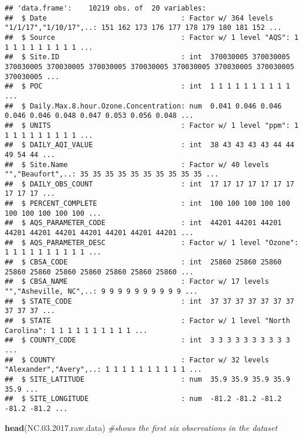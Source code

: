 \documentclass[]{article}
\newenvironment{Shaded}{\begin{snugshade}}{\end{snugshade}}
\newcommand{\KeywordTok}[1]{\textcolor[rgb]{0.13,0.29,0.53}{\textbf{#1}}}
\newcommand{\FloatTok}[1]{\textcolor[rgb]{0.00,0.00,0.81}{#1}}
\newcommand{\CommentTok}[1]{\textcolor[rgb]{0.56,0.35,0.01}{\textit{#1}}}
\newcommand{\NormalTok}[1]{#1}
\begin{document}
\begin{verbatim}
## 'data.frame':    10219 obs. of  20 variables:
##  $ Date                                : Factor w/ 364 levels "1/1/17","1/10/17",..: 151 162 173 176 177 178 179 180 181 152 ...
##  $ Source                              : Factor w/ 1 level "AQS": 1 1 1 1 1 1 1 1 1 1 ...
##  $ Site.ID                             : int  370030005 370030005 370030005 370030005 370030005 370030005 370030005 370030005 370030005 370030005 ...
##  $ POC                                 : int  1 1 1 1 1 1 1 1 1 1 ...
##  $ Daily.Max.8.hour.Ozone.Concentration: num  0.041 0.046 0.046 0.046 0.046 0.048 0.047 0.053 0.056 0.048 ...
##  $ UNITS                               : Factor w/ 1 level "ppm": 1 1 1 1 1 1 1 1 1 1 ...
##  $ DAILY_AQI_VALUE                     : int  38 43 43 43 43 44 44 49 54 44 ...
##  $ Site.Name                           : Factor w/ 40 levels "","Beaufort",..: 35 35 35 35 35 35 35 35 35 35 ...
##  $ DAILY_OBS_COUNT                     : int  17 17 17 17 17 17 17 17 17 17 ...
##  $ PERCENT_COMPLETE                    : int  100 100 100 100 100 100 100 100 100 100 ...
##  $ AQS_PARAMETER_CODE                  : int  44201 44201 44201 44201 44201 44201 44201 44201 44201 44201 ...
##  $ AQS_PARAMETER_DESC                  : Factor w/ 1 level "Ozone": 1 1 1 1 1 1 1 1 1 1 ...
##  $ CBSA_CODE                           : int  25860 25860 25860 25860 25860 25860 25860 25860 25860 25860 ...
##  $ CBSA_NAME                           : Factor w/ 17 levels "","Asheville, NC",..: 9 9 9 9 9 9 9 9 9 9 ...
##  $ STATE_CODE                          : int  37 37 37 37 37 37 37 37 37 37 ...
##  $ STATE                               : Factor w/ 1 level "North Carolina": 1 1 1 1 1 1 1 1 1 1 ...
##  $ COUNTY_CODE                         : int  3 3 3 3 3 3 3 3 3 3 ...
##  $ COUNTY                              : Factor w/ 32 levels "Alexander","Avery",..: 1 1 1 1 1 1 1 1 1 1 ...
##  $ SITE_LATITUDE                       : num  35.9 35.9 35.9 35.9 35.9 ...
##  $ SITE_LONGITUDE                      : num  -81.2 -81.2 -81.2 -81.2 -81.2 ...
\end{verbatim}

\begin{Shaded}
\begin{Highlighting}[]
\KeywordTok{head}\NormalTok{(NC.}\FloatTok{03.2017}\NormalTok{.raw.data) }\CommentTok{#shows the first six observations in the dataset}
\end{Highlighting}
\end{Shaded}
\end{document}
